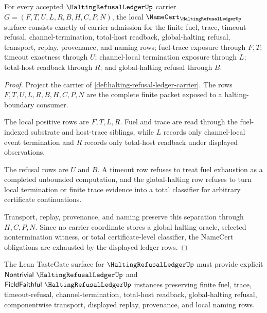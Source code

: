 \begin{theorem}
\label{thm:halting-refusal-ledger-namecert-obligations}
For every accepted $\HaltingRefusalLedgerUp$ carrier $G=(F,T,U,L,R,B,H,C,P,N)$, the local $\NameCert_{\HaltingRefusalLedgerUp}$ surface consists exactly of carrier admission for the finite fuel, trace, timeout-refusal, channel-termination, total-host readback, global-halting refusal, transport, replay, provenance, and naming rows; fuel-trace exposure through $F,T$; timeout exactness through $U$; channel-local termination exposure through $L$; total-host readback through $R$; and global-halting refusal through $B$.
\end{theorem}
\begin{proof}
Project the carrier of \autoref{def:halting-refusal-ledger-carrier}. The rows $F,T,U,L,R,B,H,C,P,N$ are the complete finite packet exposed to a halting-boundary consumer.

The local positive rows are $F,T,L,R$. Fuel and trace are read through the fuel-indexed substrate and host-trace siblings, while $L$ records only channel-local event termination and $R$ records only total-host readback under displayed observations.

The refusal rows are $U$ and $B$. A timeout row refuses to treat fuel exhaustion as a completed unbounded computation, and the global-halting row refuses to turn local termination or finite trace evidence into a total classifier for arbitrary certificate continuations.

Transport, replay, provenance, and naming preserve this separation through $H,C,P,N$. Since no carrier coordinate stores a global halting oracle, selected nontermination witness, or total certificate-level classifier, the NameCert obligations are exhausted by the displayed ledger rows.
\end{proof}

The Lean TasteGate surface for $\HaltingRefusalLedgerUp$ must provide explicit $\mathsf{Nontrivial}\ \HaltingRefusalLedgerUp$ and $\mathsf{FieldFaithful}\ \HaltingRefusalLedgerUp$ instances preserving finite fuel, trace, timeout-refusal, channel-termination, total-host readback, global-halting refusal, componentwise transport, displayed replay, provenance, and local naming rows.


